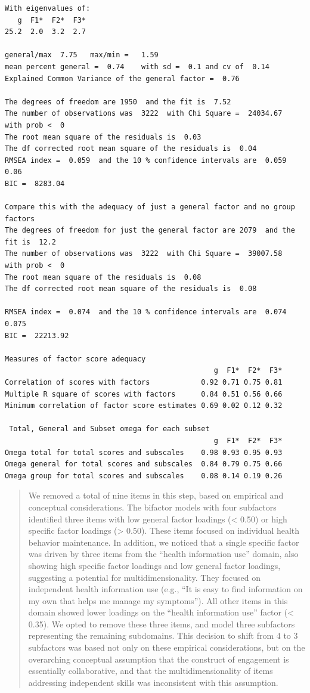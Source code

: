 \documentclass[
]{article}
\begin{document}
\begin{verbatim}
With eigenvalues of:
   g  F1*  F2*  F3* 
25.2  2.0  3.2  2.7 

general/max  7.75   max/min =   1.59
mean percent general =  0.74    with sd =  0.1 and cv of  0.14 
Explained Common Variance of the general factor =  0.76 

The degrees of freedom are 1950  and the fit is  7.52 
The number of observations was  3222  with Chi Square =  24034.67  with prob <  0
The root mean square of the residuals is  0.03 
The df corrected root mean square of the residuals is  0.04
RMSEA index =  0.059  and the 10 % confidence intervals are  0.059 0.06
BIC =  8283.04

Compare this with the adequacy of just a general factor and no group factors
The degrees of freedom for just the general factor are 2079  and the fit is  12.2 
The number of observations was  3222  with Chi Square =  39007.58  with prob <  0
The root mean square of the residuals is  0.08 
The df corrected root mean square of the residuals is  0.08 

RMSEA index =  0.074  and the 10 % confidence intervals are  0.074 0.075
BIC =  22213.92 

Measures of factor score adequacy             
                                                 g  F1*  F2*  F3*
Correlation of scores with factors            0.92 0.71 0.75 0.81
Multiple R square of scores with factors      0.84 0.51 0.56 0.66
Minimum correlation of factor score estimates 0.69 0.02 0.12 0.32

 Total, General and Subset omega for each subset
                                                 g  F1*  F2*  F3*
Omega total for total scores and subscales    0.98 0.93 0.95 0.93
Omega general for total scores and subscales  0.84 0.79 0.75 0.66
Omega group for total scores and subscales    0.08 0.14 0.19 0.26
\end{verbatim}

\begin{quote}
We removed a total of nine items in this step, based on empirical and conceptual considerations. The bifactor models with four subfactors identified three items with low general factor loadings (\textless{} 0.50) or high specific factor loadings (\textgreater{} 0.50). These items focused on individual health behavior maintenance. In addition, we noticed that a single specific factor was driven by three items from the ``health information use'' domain, also showing high specific factor loadings and low general factor loadings, suggesting a potential for multidimensionality. They focused on independent health information use (e.g., ``It is easy to find information on my own that helps me manage my symptoms''). All other items in this domain showed lower loadings on the ``health information use'' factor (\textless{} 0.35). We opted to remove these three items, and model three subfactors representing the remaining subdomains. This decision to shift from 4 to 3 subfactors was based not only on these empirical considerations, but on the overarching conceptual assumption that the construct of engagement is essentially collaborative, and that the multidimensionality of items addressing independent skills was inconsistent with this assumption.
\end{quote}
\end{document}
